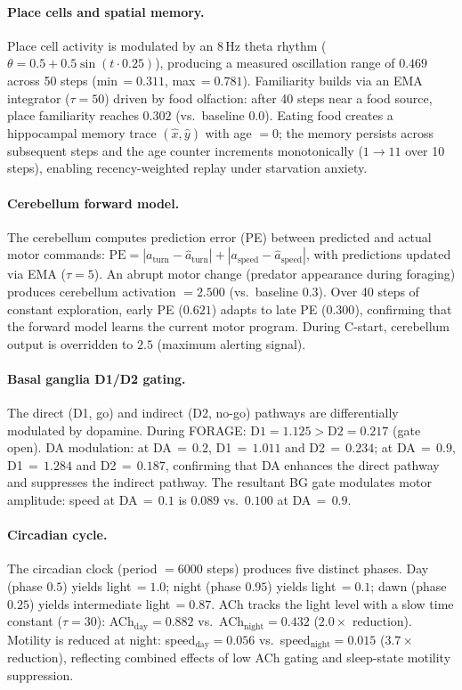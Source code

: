 \documentclass[11pt,a4paper]{article}
\begin{document}
\paragraph{Place cells and spatial memory.}
Place cell activity is modulated by an 8\,Hz theta rhythm
($\theta = 0.5 + 0.5\sin(t \cdot 0.25)$), producing a measured oscillation
range of $0.469$ across 50 steps (min\,$= 0.311$, max\,$= 0.781$).
Familiarity builds via an EMA integrator ($\tau = 50$) driven by food
olfaction: after 40 steps near a food source, place familiarity
reaches $0.302$ (vs.\ baseline $0.0$). Eating food creates a hippocampal
memory trace $(\hat{x}, \hat{y})$ with age $= 0$; the memory persists across
subsequent steps and the age counter increments monotonically ($1 \to 11$
over 10 steps), enabling recency-weighted replay under starvation anxiety.

\paragraph{Cerebellum forward model.}
The cerebellum computes prediction error (PE) between predicted and actual
motor commands: $\text{PE} = |a_\text{turn} - \hat{a}_\text{turn}| +
|a_\text{speed} - \hat{a}_\text{speed}|$, with predictions updated via
EMA ($\tau = 5$). An abrupt motor change (predator appearance during
foraging) produces cerebellum activation $= 2.500$ (vs.\ baseline $0.3$).
Over 40 steps of constant exploration, early PE ($0.621$) adapts to
late PE ($0.300$), confirming that the forward model learns the current
motor program. During C-start, cerebellum output is overridden to $2.5$
(maximum alerting signal).

\paragraph{Basal ganglia D1/D2 gating.}
The direct (D1, go) and indirect (D2, no-go) pathways are differentially
modulated by dopamine. During FORAGE: $\text{D1} = 1.125 > \text{D2} = 0.217$
(gate open). DA modulation: at DA$\,{=}\,0.2$, D1$\,{=}\,1.011$ and
D2$\,{=}\,0.234$; at DA$\,{=}\,0.9$, D1$\,{=}\,1.284$ and D2$\,{=}\,0.187$,
confirming that DA enhances the direct pathway and suppresses the indirect
pathway. The resultant BG gate modulates motor amplitude: speed at
DA$\,{=}\,0.1$ is $0.089$ vs.\ $0.100$ at DA$\,{=}\,0.9$.

\paragraph{Circadian cycle.}
The circadian clock (period $= 6000$ steps) produces five distinct phases.
Day (phase $0.5$) yields light\,$= 1.0$; night (phase $0.95$) yields
light\,$= 0.1$; dawn (phase $0.25$) yields intermediate light\,$= 0.87$.
ACh tracks the light level with a slow time constant ($\tau = 30$):
ACh$_\text{day} = 0.882$ vs.\ ACh$_\text{night} = 0.432$ ($2.0\times$ reduction).
Motility is reduced at night: speed$_\text{day} = 0.056$ vs.\
speed$_\text{night} = 0.015$ ($3.7\times$ reduction), reflecting combined
effects of low ACh gating and sleep-state motility suppression.
\end{document}
